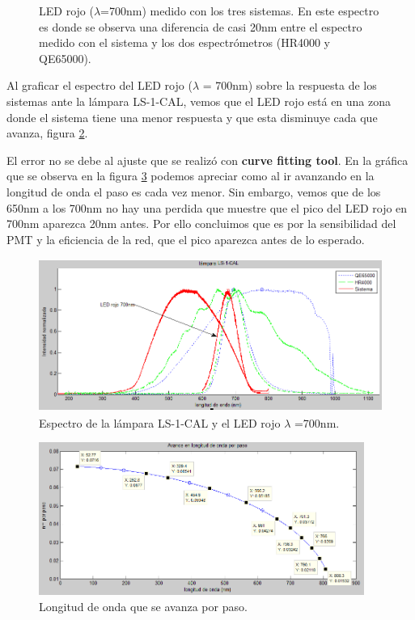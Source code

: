 \begin{figure}[h]
	\centering
	\caption[LED rojo, de longitud de onda 700nm]{LED rojo ($\lambda$=700nm) medido con los tres sistemas. En este espectro es donde se observa una diferencia de casi 20nm entre el espectro medido con el sistema y los dos espectrómetros (HR4000 y QE65000).}
	\label{fig:r700}
\end{figure}
\clearpage
Al graficar el espectro del LED rojo ($\lambda$ = 700nm) sobre la respuesta de los sistemas ante la lámpara LS-1-CAL, vemos que el LED rojo está en una zona donde el sistema tiene una menor respuesta y que esta disminuye cada que avanza, figura \ref{fig:ls-rojo}. 

El error no se debe al ajuste que se realizó con \textbf{curve fitting tool}. En la gráfica que se observa en la figura \ref{fig:pasotam} podemos apreciar como al ir avanzando en la longitud de onda el paso es cada vez menor. Sin embargo, vemos que de los 650nm a los 700nm no hay una perdida que muestre que el pico del LED rojo en 700nm aparezca 20nm antes. Por ello concluimos que es por la sensibilidad del PMT y la eficiencia de la red, que el pico aparezca antes de lo esperado. 
\begin{figure}[h]
	\centering
	\includegraphics[width=0.9\linewidth,height=5cm]{Imagenes/4/ls-rojo}
	\caption{Espectro de la lámpara LS-1-CAL y el LED rojo $\lambda$ =700nm.}
	\label{fig:ls-rojo}
\end{figure}
\begin{figure}[h]
	\centering
	\includegraphics[width=0.9\linewidth,height=5cm]{Imagenes/4/pasotam}
	\caption{Longitud de onda que se avanza por paso.}
	\label{fig:pasotam}
\end{figure}

